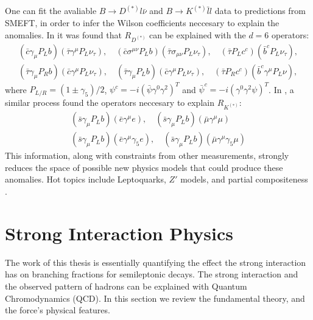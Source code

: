 One can fit the avaliable $B\to D^{(*)}l\bar{\nu}$ and $B\to K^{(*)}\bar{l}l$ data to predictions from SMEFT, in order to infer the Wilson coefficients neccesary to explain the anomalies. In \cite{Freytsis:2015qca} it was found that $R_{D^{(*)}}$ can be explained with the $d=6$ operators:
\begin{gather}
  \nonumber
  (\bar{c}\gamma_{\mu}P_L b)(\bar{\tau}\gamma^{\mu} P_L \nu_{\tau}), \quad
  (\bar{c}\sigma^{\mu\nu} P_L b)(\bar{\tau} \sigma_{\mu\nu} P_L \nu_{\tau}), \quad
  (\bar{\tau} P_L c^c)(\bar{b}^c P_L \nu_{\tau}), \\
  (\bar{\tau}\gamma_{\mu} P_R b) (\bar{c} \gamma^{\mu} P_L \nu_{\tau}), \quad
  (\bar{\tau}\gamma_{\mu}P_L b)(\bar{c}\gamma^{\mu} P_L \nu_{\tau}), \quad
  (\bar{\tau}P_R c^c)(\bar{b}^c \gamma^{\mu} P_L \nu),
\end{gather}
where $P_{L/R} = (1\pm \gamma_5)/2$, $\psi^c = -i(\bar{\psi}\gamma^0\gamma^2)^T$ and $\bar{\psi}^c = -i(\gamma^0\gamma^2 \psi)^T$. In \cite{Altmannshofer:2017yso}, a similar process found the operators neccesary to explain $R_{K^{(*)}}$:
\begin{gather}
  \nonumber
  (\bar{s}\gamma_{\mu}P_L b)(\bar{e}\gamma^{\mu}e), \quad (\bar{s}\gamma_{\mu}P_L b)(\bar{\mu}\gamma^{\mu}\mu) \\
  (\bar{s}\gamma_{\mu}P_L b)(\bar{e}\gamma^{\mu}\gamma_5e), \quad (\bar{s}\gamma_{\mu}P_L b)(\bar{\mu}\gamma^{\mu}\gamma_5\mu)
\end{gather}
This information, along with constraints from other measurements, strongly reduces the space of possible new physics models that could produce these anomalies. Hot topics include Leptoquarks, $Z'$ models, and partial compositeness \cite{Altmannshofer:2017yso,Freytsis:2015qca,Bauer:2015knc,Crivellin:2015mga}.




\section{Strong Interaction Physics}
\label{sec:stronginteractions}

The work of this thesis is essentially quantifying the effect the strong interaction has on branching fractions for semileptonic decays. The strong interaction and the observed pattern of hadrons can be explained with Quantum Chromodynamics (QCD). In this section we review the fundamental theory, and the force's physical features.

